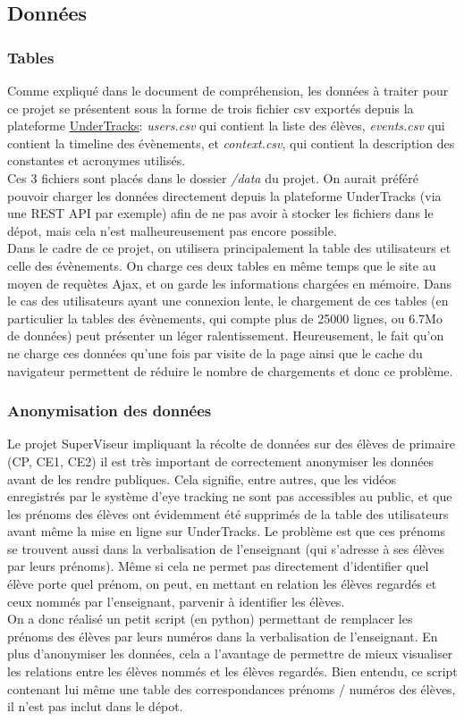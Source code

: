 \documentclass{article}
\begin{document}
\subsection{Données}
\subsubsection{Tables}
Comme expliqué dans le document de compréhension, les données à traiter pour ce projet se présentent sous la forme de trois fichier csv exportés depuis la plateforme \href{https://undertracks.imag.fr/}{UnderTracks}: \textit{users.csv} qui contient la liste des élèves, \textit{events.csv} qui contient la timeline des évènements, et \textit{context.csv}, qui contient la description des constantes et acronymes utilisés.\\
Ces 3 fichiers sont placés dans le dossier \textit{/data} du projet. On aurait préféré pouvoir charger les données directement depuis la plateforme UnderTracks (via une REST API par exemple) afin de ne pas avoir à stocker les fichiers dans le dépot, mais cela n'est malheureusement pas encore possible.\\
Dans le cadre de ce projet, on utilisera principalement la table des utilisateurs et celle des évènements. On charge ces deux tables en même temps que le site au moyen de requètes Ajax, et on garde les informations chargées en mémoire. Dans le cas des utilisateurs ayant une connexion lente, le chargement de ces tables (en particulier la tables des évènements, qui compte plus de 25000 lignes, ou 6.7Mo de données) peut présenter un léger ralentissement. Heureusement, le fait qu'on ne charge ces données qu'une fois par visite de la page ainsi que le cache du navigateur permettent de réduire le nombre de chargements et donc ce problème.

\subsubsection{Anonymisation des données}
Le projet SuperViseur impliquant la récolte de données sur des élèves de primaire (CP, CE1, CE2) il est très important de correctement anonymiser les données avant de les rendre publiques. Cela signifie, entre autres, que les vidéos enregistrés par le système d'eye tracking ne sont pas accessibles au public, et que les prénoms des élèves ont évidemment été supprimés de la table des utilisateurs avant même la mise en ligne sur UnderTracks. Le problème est que ces prénoms se trouvent aussi dans la verbalisation de l'enseignant (qui s'adresse à ses élèves par leurs prénoms). Même si cela ne permet pas directement d'identifier quel élève porte quel prénom, on peut, en mettant en relation les élèves regardés et ceux nommés par l'enseignant, parvenir à identifier les élèves.\\
On a donc réalisé un petit script (en python) permettant de remplacer les prénoms des élèves par leurs numéros dans la verbalisation de l'enseignant. En plus d'anonymiser les données, cela a l'avantage de permettre de mieux visualiser les relations entre les élèves nommés et les élèves regardés. Bien entendu, ce script contenant lui même une table des correspondances prénoms / numéros des élèves, il n'est pas inclut dans le dépot.
\end{document}
